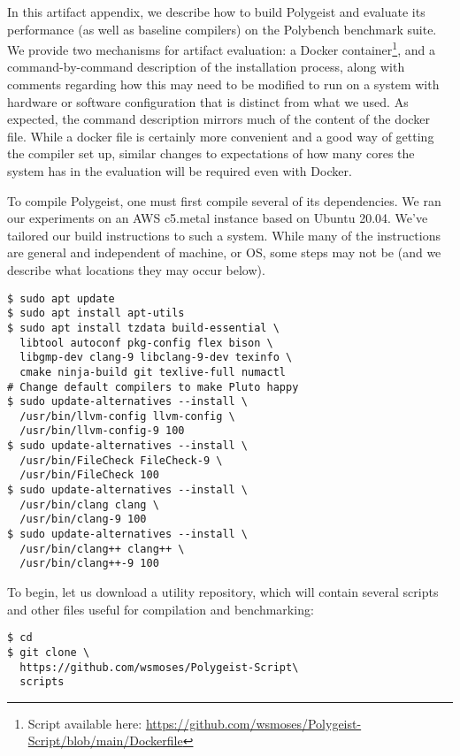 
\appendix
In this artifact appendix, we describe how to build Polygeist and evaluate its performance (as well as baseline compilers) on the Polybench benchmark suite. We provide two mechanisms for artifact evaluation: a Docker container\footnote{Script available here: \url{https://github.com/wsmoses/Polygeist-Script/blob/main/Dockerfile}}, and a command-by-command description of the installation process, along with comments regarding how this may need to be modified to run on a system with hardware or software configuration that is distinct from what we used. As expected, the command description mirrors much of the content of the docker file. While a docker file is certainly more convenient and a good way of getting the compiler set up, similar changes to expectations of how many cores the system has in the evaluation will be required even with Docker.

To compile Polygeist, one must first compile several of its dependencies. We ran our experiments on an AWS c5.metal instance based on Ubuntu 20.04. We've tailored our build instructions to such a system. While many of the instructions are general and independent of machine, or OS, some steps may not be (and we describe what locations they may occur below).

\begin{small}
\begin{verbatim}
$ sudo apt update
$ sudo apt install apt-utils
$ sudo apt install tzdata build-essential \
  libtool autoconf pkg-config flex bison \
  libgmp-dev clang-9 libclang-9-dev texinfo \
  cmake ninja-build git texlive-full numactl
# Change default compilers to make Pluto happy
$ sudo update-alternatives --install \
  /usr/bin/llvm-config llvm-config \
  /usr/bin/llvm-config-9 100
$ sudo update-alternatives --install \
  /usr/bin/FileCheck FileCheck-9 \
  /usr/bin/FileCheck 100
$ sudo update-alternatives --install \
  /usr/bin/clang clang \
  /usr/bin/clang-9 100
$ sudo update-alternatives --install \
  /usr/bin/clang++ clang++ \
  /usr/bin/clang++-9 100
\end{verbatim}
\end{small}

\noindent To begin, let us download a utility repository, which will contain several scripts and other files useful for compilation and benchmarking:

\begin{small}
\begin{verbatim}
$ cd 
$ git clone \
  https://github.com/wsmoses/Polygeist-Script\
  scripts
\end{verbatim}
\end{small}

